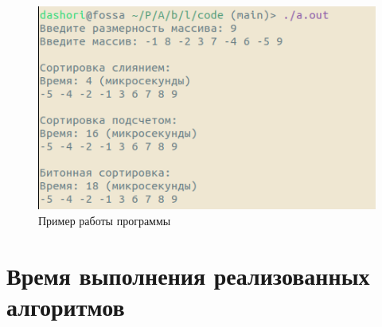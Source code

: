 \begin{figure}[h]
	\centering
	\includegraphics[width=130mm]{images/example}
	\caption{Пример работы программы}
	\label{img:example}
\end{figure}

\section{Время выполнения реализованных алгоритмов}

